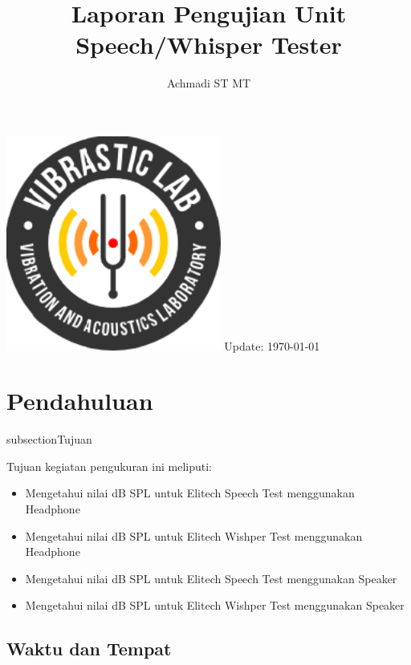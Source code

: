 \documentclass[12pt,]{article}
\title{\LARGE \bf
	Laporan Pengujian Unit Speech/Whisper Tester\\
}
\author{Achmadi ST MT}
\date{}
\begin{document}
	\thispagestyle{empty}
	\pagestyle{empty}

	\begin{titlepage}
		\centering
		\vfill
		\vfill
		\maketitle
		\vfill
		\includegraphics[width=200pt]{images/logo/logoviblab}
		\vfill
		\vfill
		Update: {\today} \currenttime \\
	\end{titlepage}


	\newpage
	\tableofcontents


	\newpage
	\section{Pendahuluan}

	subsection{Tujuan}

	Tujuan kegiatan pengukuran ini meliputi:
	\begin{itemize}
		\item Mengetahui nilai dB SPL untuk Elitech Speech Test menggunakan Headphone
		\item Mengetahui nilai dB SPL untuk Elitech Wishper Test menggunakan Headphone
		\item Mengetahui nilai dB SPL untuk Elitech Speech Test menggunakan Speaker
		\item Mengetahui nilai dB SPL untuk Elitech Wishper Test menggunakan Speaker
	\end{itemize}

	\subsection{Waktu dan Tempat}
\end{document}
